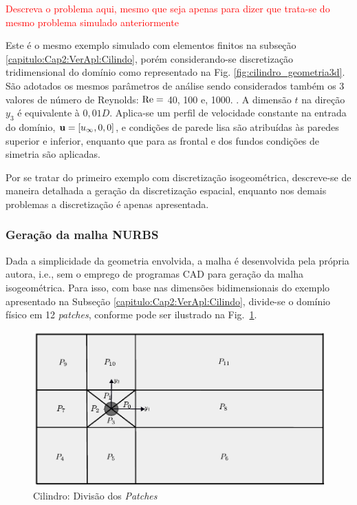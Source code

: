\documentclass[tese_patricia]{subfiles}
\begin{document}
\textcolor{red}{Descreva o problema aqui, mesmo que seja apenas para dizer que trata-se do mesmo problema simulado anteriormente}

Este é o mesmo exemplo simulado com elementos finitos na subseção \ref{capitulo:Cap2:VerApl:Cilindo}, porém considerando-se discretização tridimensional do domínio como representado na Fig. \ref{fig:cilindro_geometria3d}. São adotados os mesmos parâmetros de análise sendo considerados também os 3 valores de número de Reynolds: $\mathrm{Re} =$ 40, 100 e, 1000. . A dimensão $t$ na direção $y_3$ é equivalente à $0,01D$. Aplica-se um perfil de velocidade constante na entrada do domínio, $\mathbf{u}=[u_\infty,0,0]$, e condições de parede lisa são atribuídas às paredes superior e inferior, enquanto que para as frontal e dos fundos condições de simetria são aplicadas.

Por se tratar do primeiro exemplo com discretização isogeométrica, descreve-se de maneira detalhada a geração da discretização espacial, enquanto nos demais problemas a discretização é apenas apresentada.

\subsubsection {Geração da malha NURBS} \label{Cap3:VerApl:Cilindro:Malha}

Dada a simplicidade da geometria envolvida, a malha é desenvolvida pela própria autora, i.e., sem o emprego de programas CAD para geração da malha isogeométrica. Para isso, com base nas dimensões bidimensionais do exemplo apresentado na Subseção \ref{capitulo:Cap2:VerApl:Cilindo}, divide-se o domínio físico em 12 \textit{patches}, conforme pode ser ilustrado na Fig.~\ref{fig:cilindro_IGA_patches}.

\begin{figure}[htb!]
	\centering 
	\includegraphics[scale=0.7,trim=0cm 0cm 0cm 0cm, clip=true]{Imagens/Cap3/cilindro_iga_patches.pdf}	
	\caption{Cilindro: Divisão dos \textit{Patches} }
	\label{fig:cilindro_IGA_patches}
\end{figure}
\end{document}

